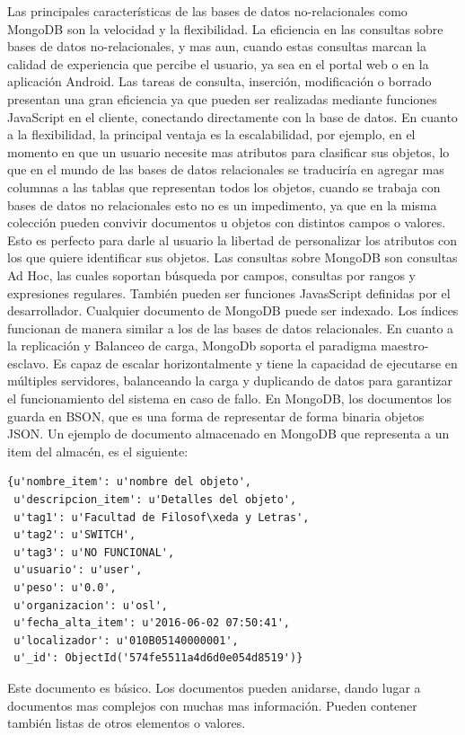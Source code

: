 \documentclass[a4paper,11pt]{book}
\begin{document}
Las principales características de las bases de datos no-relacionales como MongoDB son la velocidad y la flexibilidad. La eficiencia en las consultas sobre bases de datos no-relacionales, y mas aun, cuando estas consultas marcan la calidad de experiencia que percibe el usuario, ya sea en el portal web o en la aplicación Android.  Las tareas de consulta, inserción, modificación o borrado presentan una gran eficiencia ya que pueden ser realizadas mediante funciones JavaScript en el cliente, conectando directamente con la base de datos.
En cuanto a la flexibilidad, la principal ventaja es la escalabilidad, por ejemplo, en el momento en que un usuario necesite mas atributos para clasificar sus objetos, lo que en el mundo de las bases de datos relacionales se traduciría en agregar mas columnas a las tablas que representan todos los objetos, cuando se trabaja con bases de datos no relacionales esto no es un impedimento, ya que en la misma colección pueden convivir documentos u objetos con distintos campos o valores. Esto es perfecto para darle al usuario la libertad de personalizar los atributos con los que quiere identificar sus objetos. 
Las consultas sobre MongoDB son consultas Ad Hoc, las cuales soportan búsqueda por campos, consultas por rangos y expresiones regulares. También pueden ser funciones JavasScript definidas por el desarrollador. 
Cualquier documento de MongoDB puede ser indexado. Los índices funcionan de manera similar a los de las bases de datos relacionales. 
En cuanto a la replicación y Balanceo de carga, MongoDb soporta el paradigma maestro-esclavo. Es capaz de escalar horizontalmente y tiene la capacidad de ejecutarse en múltiples servidores, balanceando la carga y duplicando de datos para garantizar el funcionamiento del sistema en caso de fallo. 
En MongoDB, los documentos los guarda en BSON, que es una forma de representar de forma binaria objetos JSON. Un ejemplo de documento almacenado en MongoDB que representa a un item del almacén, es el siguiente:
\begin{lstlisting}
{u'nombre_item': u'nombre del objeto', 
 u'descripcion_item': u'Detalles del objeto', 
 u'tag1': u'Facultad de Filosof\xeda y Letras',
 u'tag2': u'SWITCH',
 u'tag3': u'NO FUNCIONAL',
 u'usuario': u'user',
 u'peso': u'0.0',
 u'organizacion': u'osl',
 u'fecha_alta_item': u'2016-06-02 07:50:41',
 u'localizador': u'010B05140000001',
 u'_id': ObjectId('574fe5511a4d6d0e054d8519')}
\end{lstlisting}
Este documento es básico. Los documentos pueden anidarse, dando lugar a documentos mas complejos con muchas mas información. Pueden contener también listas de otros elementos o valores. 
\end{document}
